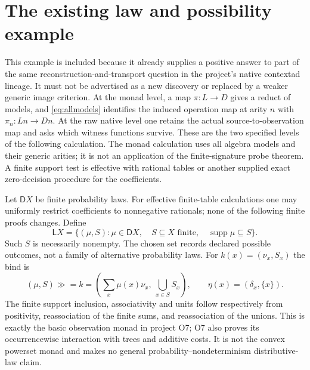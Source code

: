 \documentclass[11pt]{article}
\theoremstyle{definition}
\theoremstyle{remark}
\begin{document}
\section{The existing law and possibility example}\label{sec:o7}
\label{subsec:dc-law}

This example is included because it already supplies a positive answer to
part of the same reconstruction-and-transport question in the project's
native contextad lineage. It must not be advertised as a new discovery or
replaced by a weaker generic image criterion. At the monad level, a map
$\pi:L\to D$ gives a reduct of models, and
\eqref{eq:allmodels} identifies the induced operation map at arity $n$
with $\pi_n:Ln\to Dn$. At the raw native level one retains the actual
source-to-observation map and asks which witness functions survive.
These are the two specified levels of the following calculation. The
monad calculation uses all algebra models and their generic arities; it is
not an application of the finite-signature probe theorem. A finite support
test is effective with rational tables or another supplied exact
zero-decision procedure for the coefficients.


Let $\mathsf D X$ be finite probability laws. For effective finite-table
calculations one may uniformly restrict coefficients to nonnegative
rationals; none of the following finite proofs changes. Define
\[
 \mathsf L X=\{(\mu,S):\mu\in\mathsf D X,\quad
     S\subseteq X\text{ finite},\quad\operatorname{supp}\mu\subseteq S\}.
\]
Such $S$ is necessarily nonempty. The chosen set records declared
possible outcomes, not a family of alternative probability laws. For
$k(x)=(\nu_x,S_x)$ the bind is
\begin{equation}\label{eq:dc-Lbind}
 (\mu,S)\mathbin{\gg=}k
 =\left(\sum_x\mu(x)\nu_x,\ \bigcup_{x\in S}S_x\right),
 \qquad \eta(x)=(\delta_x,\{x\}).
\end{equation}
The finite support inclusion, associativity and units follow respectively
from positivity, reassociation of the finite sums, and reassociation of
the unions. This is exactly the basic observation monad in project O7;
O7 also proves its occurrencewise interaction with trees and additive
costs. It is not the convex powerset monad and makes no general
probability--nondeterminism distributive-law claim.
\end{document}
